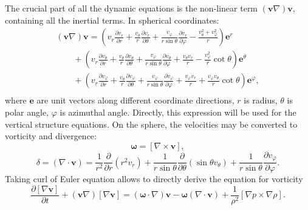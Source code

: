 \documentclass[usenatbib,onecolumn]{mnras}
\renewcommand{\vector}[1]{\ensuremath{\mathbf{#1}}}
\newcommand{\pardir}[2]{\ensuremath{\frac{\partial #2}{\partial #1} }}
\newcommand{\ppardir}[2]{\ensuremath{\frac{\partial }{\partial #1} \left( #2\right)}}
\begin{document}
The crucial part of all the dynamic equations is the non-linear term
$(\vector{v}\nabla) \vector{v}$, containing all the inertial terms. In
spherical coordinates:
\begin{equation}\label{E:vdv}
  \begin{array}{l}
\displaystyle  (\vector{v}\nabla) \vector{v} = \left( v_r \pardir{r}{v_r} +
  \frac{v_\theta}{r} \pardir{\theta}{v_r} + \frac{v_\varphi}{r \sin
    \theta} \pardir{\varphi}{v_r} - \frac{v_\theta^2+v_\varphi^2}{r}\right)
  \vector{e}^r  \\
\displaystyle   \qquad{}   + \left( v_r \pardir{r}{v_\theta} + \frac{v_\theta}{r}\pardir{\theta}{v_\theta} +
  \frac{v_\varphi}{r\sin\theta} \pardir{\varphi}{v_\theta} + \frac{v_\theta
    v_r}{r} - \frac{v_\varphi^2}{r}\cot\theta\right) \vector{e}^\theta
   \\
\displaystyle   \qquad{}   +
   \left( v_r \pardir{r}{v_\varphi}  + 
   \frac{v_\theta}{r}\pardir{\theta}{v_\varphi} +
   \frac{v_\varphi}{r\sin\theta}\pardir{\varphi}{v_\varphi} + \frac{v_\varphi
     v_r}{r} + \frac{v_\varphi
     v_\theta}{r}\cot\theta\right) \vector{e}^\varphi,\\
   \end{array}
\end{equation}
where $\vector{e}$ are unit vectors along different coordinate directions, $r$
is radius, $\theta$ is polar angle, $\varphi$ is azimuthal
angle. Directly, this expression will be used for the vertical structure
equations. On the sphere, the velocities may be converted to
vorticity  and divergence:
\begin{equation}\label{E:vort}
  \displaystyle   \vector{\omega} = \left[ \nabla \times \vector{v}\right],
\end{equation}
\begin{equation}\label{E:div}
\displaystyle   \delta = (\nabla \cdot \vector{v}) = \frac{1}{r^2}\ppardir{r}{r^2v_r} +
  \frac{1}{r\sin \theta} \ppardir{\theta}{\sin \theta v_\theta} + \frac{1}{r\sin \theta}\pardir{\varphi}{v_\varphi} .
\end{equation}
Taking curl of Euler equation allows to directly derive the equation for
vorticity
\begin{equation}\label{E:Ecurl}
\displaystyle   \pardir{t}{\left[\nabla \vector{v}\right]} +
  (\vector{v}\nabla)\left[\nabla \vector{v}\right] = (\vector{\omega} \cdot
\nabla) \vector{v} - \vector{\omega} (\nabla \cdot \vector{v}) +
  \frac{1}{\rho^2}\left[\nabla p \times \nabla \rho \right].
\end{equation}
\end{document}
